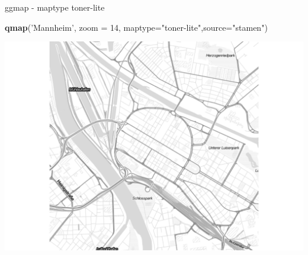 \documentclass[ignorenonframetext,]{beamer}
\newenvironment{Shaded}{}{}
\newcommand{\KeywordTok}[1]{\textcolor[rgb]{0.00,0.44,0.13}{\textbf{{#1}}}}
\newcommand{\DataTypeTok}[1]{\textcolor[rgb]{0.56,0.13,0.00}{{#1}}}
\newcommand{\DecValTok}[1]{\textcolor[rgb]{0.25,0.63,0.44}{{#1}}}
\newcommand{\StringTok}[1]{\textcolor[rgb]{0.25,0.44,0.63}{{#1}}}
\newcommand{\NormalTok}[1]{{#1}}
\begin{document}
\begin{frame}[fragile]{ggmap - maptype toner-lite}

\begin{Shaded}
\begin{Highlighting}[]
\KeywordTok{qmap}\NormalTok{(}\StringTok{'Mannheim'}\NormalTok{, }\DataTypeTok{zoom =} \DecValTok{14}\NormalTok{,}
 \DataTypeTok{maptype=}\StringTok{"toner-lite"}\NormalTok{,}\DataTypeTok{source=}\StringTok{"stamen"}\NormalTok{)}
\end{Highlighting}
\end{Shaded}

\includegraphics{R_intern_files/figure-beamer/unnamed-chunk-273-1.pdf}

\end{frame}
\end{document}
